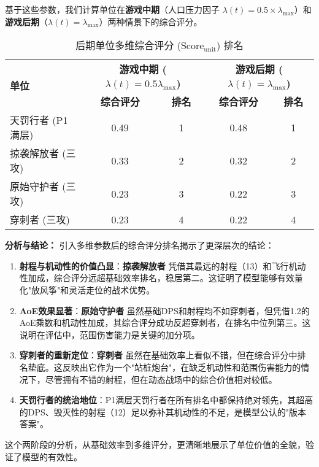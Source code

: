 \documentclass[a4paper,12pt]{article}
\begin{document}
\begin{CJK}{UTF8}{gbsn}
基于这些参数，我们计算单位在\textbf{游戏中期}（人口压力因子 $\lambda(t) = 0.5 \times \lambda_{\max}$）和\textbf{游戏后期}（$\lambda(t) = \lambda_{\max}$）两种情景下的综合评分。

\begin{table*}[htbp]
\centering
\caption{后期单位多维综合评分 ($\text{Score}_{\text{unit}}$) 排名}
\label{tab:unit_score_ranking_final}
\begin{tabular}{l|cc|cc}
\toprule
\multirow{2}{*}{\textbf{单位}} & \multicolumn{2}{c|}{\textbf{游戏中期 ($\lambda(t) = 0.5 \lambda_{\max}$)}} & \multicolumn{2}{c}{\textbf{游戏后期 ($\lambda(t) = \lambda_{\max}$)}} \\
& \textbf{综合评分} & \textbf{排名} & \textbf{综合评分} & \textbf{排名} \\
\midrule
天罚行者 (P1满层) & 0.49 & 1 & 0.48 & 1 \\
掠袭解放者 (三攻) & 0.33 & 2 & 0.32 & 2 \\
原始守护者 (三攻) & 0.23 & 3 & 0.22 & 3 \\
穿刺者 (三攻) & 0.23 & 4 & 0.22 & 4 \\
\bottomrule
\end{tabular}
\end{table*}

\textbf{分析与结论：}
引入多维参数后的综合评分排名揭示了更深层次的结论：
\begin{enumerate}
    \item \textbf{射程与机动性的价值凸显}：\textbf{掠袭解放者} 凭借其最远的射程（13）和飞行机动性加成，综合评分远超基础效率排名，稳居第二。这证明了模型能够有效量化"放风筝"和灵活走位的战术优势。
    \item \textbf{AoE效果显著}：\textbf{原始守护者} 虽然基础DPS和射程均不如穿刺者，但凭借1.2的AoE乘数和机动性加成，其综合评分成功反超穿刺者，在排名中位列第三。这说明在评估中，范围伤害能力是关键的加分项。
    \item \textbf{穿刺者的重新定位}：\textbf{穿刺者} 虽然在基础效率上看似不错，但在综合评分中排名垫底。这反映出它作为一个"站桩炮台"，在缺乏机动性和范围伤害能力的情况下，尽管拥有不错的射程，但在动态战场中的综合价值相对较低。
    \item \textbf{天罚行者的统治地位}：P1满层天罚行者在所有排名中都保持绝对领先，其超高的DPS、毁灭性的射程（12）足以弥补其机动性的不足，是模型公认的"版本答案"。
\end{enumerate}
这个两阶段的分析，从基础效率到多维评分，更清晰地展示了单位价值的全貌，验证了模型的有效性。


\end{CJK}
\end{document}
